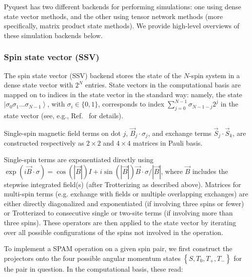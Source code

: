 \documentclass[aps,prl,twocolumn,superscriptaddress,nobibnotes,10pt,floatfix]{revtex4-2}
\begin{document}
Pyquest has two different backends for performing simulations: one using dense state vector methods, and the other using tensor network methods (more specifically, matrix product state methods).
We provide high-level overviews of these simulation backends below.

\subsubsection{Spin state vector (SSV)}\label{spin-state-vector-ssv}

The spin state vector (SSV) backend stores the state of the \(N\)-spin system in a dense state vector with \(2^{N}\) entries.
State vectors in the computational basis are mapped on to indices in the state vector in the standard way: namely, the state
\(\left| \sigma_{0}\sigma_{1}\ldots\sigma_{N - 1} \right\rangle\), with \(\sigma_{i} \in \text{\{}0,1\text{\}}\), corresponds to index \(\sum_{j = 0}^{N - 1}{\sigma_{N - 1 - j}2^{j}}\) in the state vector (see, e.g., Ref.~\cite{s_lin_exact_1993} for details).

Single-spin magnetic field terms on dot $j$, $\vec{B}_{j} \cdot \sigma_{j}$, and exchange terms $\vec{S}_{j} \cdot \vec{S}_{k}$, are constructed respectively as $2 \times 2$ and $4 \times 4$ matrices in Pauli basis.













Single-spin terms are exponentiated directly using \(\exp\left( i\vec{B} \cdot \sigma \right) = \cos\left( \left| \vec{B} \right| \right)I + i\sin\left( \left| \vec{B} \right| \right)\vec{B} \cdot \sigma \text{/}\left| \vec{B} \right|\), where \(\vec{B}\) includes the stepwise integrated field(s) (after Trotterizing as described above).
Matrices for multi-spin terms (e.g. exchange with fields or multiple overlapping exchanges) are either directly diagonalized and exponentiated (if involving three spins or fewer) or Trotterized to consecutive single or two-site terms (if involving more than three spins).
These operators are then applied to the state vector by iterating over all possible configurations of the spins not involved in the operation.

To implement a SPAM operation on a given spin pair, we first construct the projectors onto the four possible angular momentum states \(\left\{ S,T_{0},T_{+},T_{-} \right\}\) for the pair in question.
In the computational basis, these read:
\end{document}
